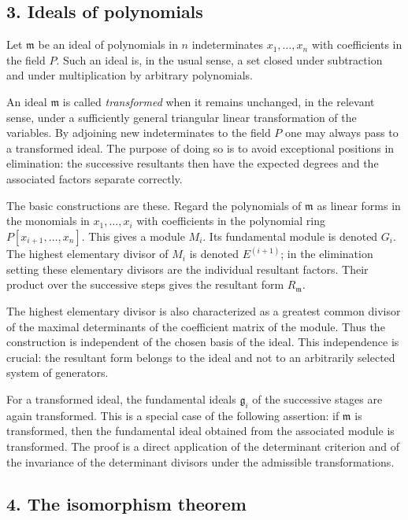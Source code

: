 \documentclass[12pt]{article}
\begin{document}
\subsection{3. Ideals of polynomials}

Let $\mathfrak m$ be an ideal of polynomials in $n$ indeterminates $x_1,\ldots,x_n$ with coefficients in the field $P$. Such an ideal is, in the usual sense, a set closed under subtraction and under multiplication by arbitrary polynomials.

An ideal $\mathfrak m$ is called \emph{transformed} when it remains unchanged, in the relevant sense, under a sufficiently general triangular linear transformation of the variables. By adjoining new indeterminates to the field $P$ one may always pass to a transformed ideal. The purpose of doing so is to avoid exceptional positions in elimination: the successive resultants then have the expected degrees and the associated factors separate correctly.

The basic constructions are these. Regard the polynomials of $\mathfrak m$ as linear forms in the monomials in $x_1,\ldots,x_i$ with coefficients in the polynomial ring $P[x_{i+1},\ldots,x_n]$. This gives a module $M_i$. Its fundamental module is denoted $G_i$. The highest elementary divisor of $M_i$ is denoted $E^{(i+1)}$; in the elimination setting these elementary divisors are the individual resultant factors. Their product over the successive steps gives the resultant form $R_{\mathfrak m}$.

The highest elementary divisor is also characterized as a greatest common divisor of the maximal determinants of the coefficient matrix of the module. Thus the construction is independent of the chosen basis of the ideal. This independence is crucial: the resultant form belongs to the ideal and not to an arbitrarily selected system of generators.

For a transformed ideal, the fundamental ideals $\mathfrak g_i$ of the successive stages are again transformed. This is a special case of the following assertion: if $\mathfrak m$ is transformed, then the fundamental ideal obtained from the associated module is transformed. The proof is a direct application of the determinant criterion and of the invariance of the determinant divisors under the admissible transformations.

\subsection{4. The isomorphism theorem}
\end{document}
